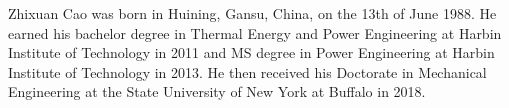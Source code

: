 
Zhixuan Cao was born in Huining, Gansu, China, on the 13th of June 1988. He earned his bachelor degree
in Thermal Energy and Power Engineering at Harbin Institute of Technology in 2011 and MS degree in Power Engineering at Harbin Institute of Technology in 2013. He then received his Doctorate in Mechanical Engineering at the State University of New York at Buffalo in 2018.